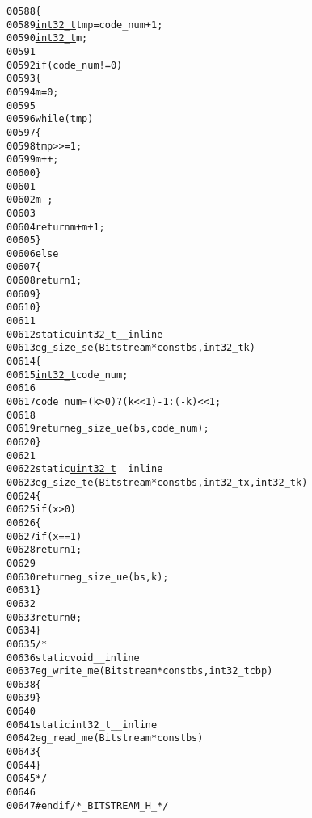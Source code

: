 \begin{footnotesize}
\begin{alltt}
00588 \{
00589     \hyperlink{_types_8h_a115ba3a1b24a8702355c5dbd61ce01e0}{int32_t} tmp = code\_num + 1;
00590     \hyperlink{_types_8h_a115ba3a1b24a8702355c5dbd61ce01e0}{int32_t} m;
00591 
00592     \textcolor{keywordflow}{if} (code\_num != 0)
00593     \{
00594         m = 0;
00595 
00596         \textcolor{keywordflow}{while} (tmp)
00597         \{
00598             tmp >>= 1;
00599             m ++;
00600         \}
00601 
00602         m --;
00603 
00604         \textcolor{keywordflow}{return} m + m + 1;
00605     \}
00606     \textcolor{keywordflow}{else}
00607     \{
00608         \textcolor{keywordflow}{return} 1;
00609     \}
00610 \}
00611 
00612 \textcolor{keyword}{static} \hyperlink{_types_8h_a04909d1366bb244ff2482beb51635f37}{uint32_t} \_\_inline
00613 eg\_size\_se(\hyperlink{struct_bitstream}{Bitstream}* \textcolor{keyword}{const} bs, \hyperlink{_types_8h_a115ba3a1b24a8702355c5dbd61ce01e0}{int32_t} k)
00614 \{
00615     \hyperlink{_types_8h_a115ba3a1b24a8702355c5dbd61ce01e0}{int32_t} code\_num;
00616 
00617     code\_num = (k > 0) ? (k << 1) - 1 : (-k) << 1;
00618 
00619     \textcolor{keywordflow}{return} eg\_size\_ue(bs, code\_num);    
00620 \}
00621 
00622 \textcolor{keyword}{static} \hyperlink{_types_8h_a04909d1366bb244ff2482beb51635f37}{uint32_t} \_\_inline
00623 eg\_size\_te(\hyperlink{struct_bitstream}{Bitstream}* \textcolor{keyword}{const} bs, \hyperlink{_types_8h_a115ba3a1b24a8702355c5dbd61ce01e0}{int32_t} x, \hyperlink{_types_8h_a115ba3a1b24a8702355c5dbd61ce01e0}{int32_t} k)
00624 \{
00625     \textcolor{keywordflow}{if} (x > 0)
00626     \{
00627         \textcolor{keywordflow}{if} (x == 1)
00628             \textcolor{keywordflow}{return} 1;
00629 
00630         \textcolor{keywordflow}{return} eg\_size\_ue(bs, k);
00631     \}
00632     
00633     \textcolor{keywordflow}{return} 0;
00634 \}
00635 \textcolor{comment}{/*}
00636 \textcolor{comment}{static void \_\_inline}
00637 \textcolor{comment}{eg\_write\_me(Bitstream* const bs, int32\_t cbp)}
00638 \textcolor{comment}{\{}
00639 \textcolor{comment}{\}}
00640 \textcolor{comment}{}
00641 \textcolor{comment}{static int32\_t \_\_inline}
00642 \textcolor{comment}{eg\_read\_me(Bitstream* const bs)}
00643 \textcolor{comment}{\{}
00644 \textcolor{comment}{\}}
00645 \textcolor{comment}{*/}
00646 
00647 \textcolor{preprocessor}{#endif }\textcolor{comment}{/* \_BITSTREAM\_H\_ */}
\end{alltt}\end{footnotesize}
